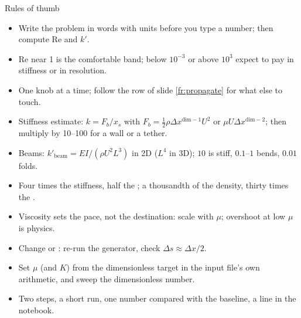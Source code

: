 \documentclass[aspectratio=169,11pt]{beamer}
\begin{document}
\begin{frame}{Rules of thumb}
\label{fr:thumb}
\small
\begin{itemize}
  \item Write the problem in words with units before you type a number; then compute $\mathrm{Re}$ and $k'$.
  \item $\mathrm{Re}$ near 1 is the comfortable band; below $10^{-3}$ or above $10^3$ expect to pay in stiffness or in resolution.
  \item One knob at a time; follow the row of slide \ref{fr:propagate} for what else to touch.
  \item Stiffness estimate: $k = F_b/x_s$ with $F_b = \frac12\rho\Delta x^{\mathrm{dim}-1}U^2$ or $\mu U\Delta x^{\mathrm{dim}-2}$; then multiply by 10--100 for a wall or a tether.
  \item Beams: $k'_{\mathrm{beam}} = EI/(\rho U^2 L^3)$ in 2D ($L^4$ in 3D); $10$ is stiff, $0.1$--$1$ bends, $0.01$ folds.
  \item Four times the stiffness, half the ; a thousandth of the density, thirty times the .
  \item Viscosity sets the pace, not the destination: scale  with $\mu$; overshoot at low $\mu$ is physics.
  \item Change  or : re-run the generator, check $\Delta s \approx \Delta x/2$.
  \item Set $\mu$ (and $K$) from the dimensionless target in the input file's own arithmetic, and sweep the dimensionless number.
  \item Two steps, a short run, one number compared with the baseline, a line in the notebook.
\end{itemize}
\end{frame}
\end{document}
